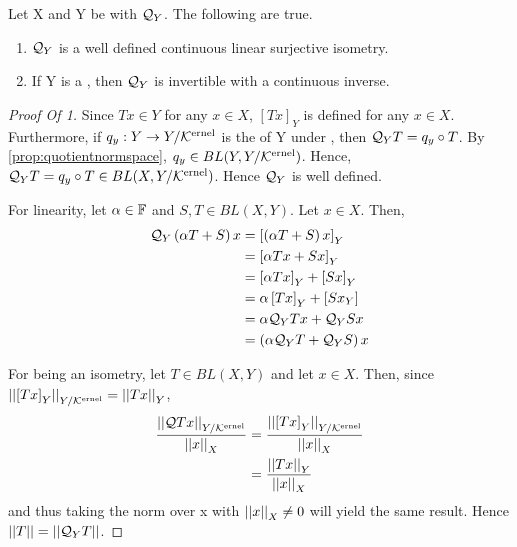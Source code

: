 \begin{prop}
\label{prop:handedquotientoperators}
    Let X and Y be 
    \SeminormedSpaces
    with \CodomainQuotientMap $\mathcal{Q}_Y$. 
    The following are true. 
    \begin{enumerate}
        \item $\mathcal{Q}_Y$ is a well defined continuous linear surjective isometry. 
        \item If Y is a \NormedSpace, then $\mathcal{Q}_Y$ is invertible with a continuous inverse. 
    \end{enumerate}
    \begin{proof}[Proof Of 1]
        Since $Tx \in Y$ for any $x \in X$, 
        $[Tx]_Y$ is defined for any $x \in X$. 
        Furthermore, if $q_y:Y \to Y/\bf\mathcal{K}\rm^{ernel}$
        is the \QuotientMap of Y under 
        \EquivalenceModKernel, then 
        $\mathcal{Q}_YT = q_y \circ T$. 
        By \ref{prop:quotientnormspace}, 
        $q_y \in BL(Y, Y/\bf\mathcal{K}\rm^{ernel})$. 
		Hence, 
		$\mathcal{Q}_YT = q_y \circ T \in BL(X,Y/\bf\mathcal{K}\rm^{ernel})$.
        Hence $\mathcal{Q}_Y$ is well defined. 

        For linearity, let $\alpha \in \mathbb{F}$
        and $S,T \in BL(X,Y)$. 
        Let $x \in X$. 
        Then, 
        \begin{align*}
            \mathcal{Q}_Y\left( \alpha T+S\right)x & = \left[ \left( \alpha T+S\right)x \right]_Y\\
            & = \left[ \alpha Tx+ Sx \right]_Y\\
            & = \left[ \alpha Tx \right]_Y+ \left[ Sx \right]_Y\\
            & = \alpha \left[ Tx \right]_Y+\left[ Sx_Y \right]\\
            & = \alpha \mathcal{Q}_YTx+ \mathcal{Q}_YSx\\
            & = \left( \alpha \mathcal{Q}_YT+\mathcal{Q}_YS\right)x
        \end{align*}

        For being an isometry, 
        let $T \in BL(X,Y)$ and 
        let $x \in X$. Then, since $\left|\left| \left[ Tx \right]_Y \right|\right|_{Y/\bf\mathcal{K}\rm^{ernel}} = \left|\left| Tx \right|\right|_Y$, 
        \begin{align*}
            \frac{\left|\left| \mathcal{Q} Tx \right|\right|_{Y/\bf\mathcal{K}\rm^{ernel}}}{\left|\left| x \right|\right|_X} & = \frac{\left|\left| \left[ Tx \right]_Y \right|\right|_{Y/\bf\mathcal{K}\rm^{ernel}}}{\left|\left| x \right|\right|_X} \\
            & = \frac{\left|\left| Tx \right|\right|_Y}{\left|\left| x \right|\right|_X} 
        \end{align*}
        and thus taking the norm over
        x with $\left|\left| x \right|\right|_X \neq 0$ will yield the
        same result. Hence $\left|\left| T \right|\right| = \left|\left| \mathcal{Q}_Y T \right|\right|$. 


\end{proof}
\end{prop}
